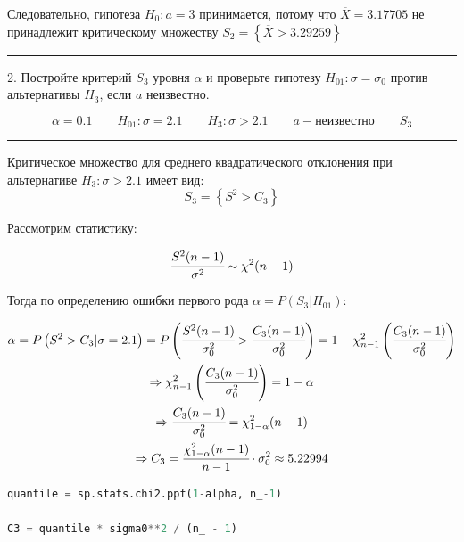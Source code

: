 \documentclass[a4paper, 14pt]{extarticle}
\begin{document}
Следовательно, гипотеза $H_0: a = 3$ принимается, потому что $\overline{X} = 3.17705$ 
не принадлежит критическому множеству $S_2 = \left\{ \overline{X} > 3.29259 \right\}$

\rule{\linewidth}{0.1mm}

2. Постройте критерий $S_3$ уровня $\alpha$ и проверьте гипотезу $H_{01}: \sigma = \sigma_0$ 
против альтернативы $H_3$, если $a$ неизвестно.

\begin{equation*}
    \alpha = 0.1 \qquad H_{01}: \sigma = 2.1 \qquad H_3: \sigma > 2.1 \qquad a - \text{неизвестно} \qquad S_3
\end{equation*}

\rule{\linewidth}{0.1mm}

Критическое множество для среднего квадратического отклонения при 
альтернативе $H_3: \sigma > 2.1$ имеет вид:
\begin{equation*}
    S_3 = \left\{ S^2 > C_3 \right\}
\end{equation*}

Рассмотрим статистику:

\begin{equation*}
    \cfrac{S^2 (n-1)}{\sigma^2} \sim \chi^2(n-1)
\end{equation*}

Тогда по определению ошибки первого рода $\alpha = P(S_3 | H_{01})$:

\begin{gather*}
    \alpha = P\left(S^2 > C_3 | \sigma = 2.1\right) = 
    P\left( \cfrac{S^2(n-1)}{\sigma_0^2} > \cfrac{C_3 (n-1)}{\sigma_0^2} \right)
    = 1 - \chi^2_{n-1} \left(\cfrac{C_3 (n-1)}{\sigma_0^2}\right) \\
    \Rightarrow \chi^2_{n-1} \left( \cfrac{C_3 (n-1)}{\sigma_0^2} \right) = 1 - \alpha \\
    \Rightarrow \cfrac{C_3 (n-1)}{\sigma_0^2} = \chi^2_{1 - \alpha}(n-1) \\
    \Rightarrow C_3 = \cfrac{\chi^2_{1 - \alpha} (n-1)}{n-1} \cdot \sigma_0^2 \approx 5.22994
\end{gather*}

\begin{center}
    \begin{lstlisting}[language=Python]
quantile = sp.stats.chi2.ppf(1-alpha, n_-1)

C3 = quantile * sigma0**2 / (n_ - 1)
    \end{lstlisting}
\end{center}
\end{document}
